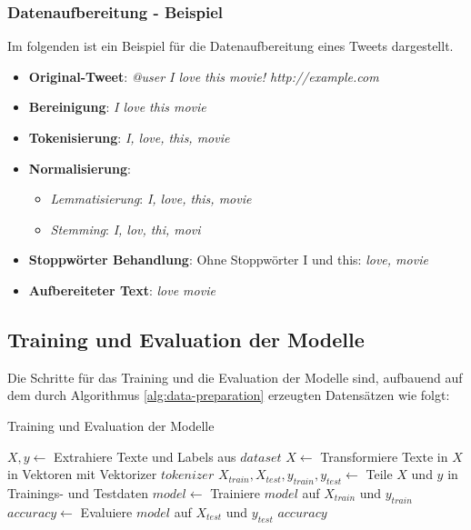 \subsubsection{Datenaufbereitung - Beispiel}

Im folgenden ist ein Beispiel für die Datenaufbereitung eines Tweets dargestellt.
\begin{itemize}
    \item \textbf{Original-Tweet}: \textit{\glqq @user I love this movie! http://example.com\grqq}
    \item \textbf{Bereinigung}: \textit{\glqq I love this movie\grqq}
    \item \textbf{Tokenisierung}: \textit{\glqq I\grqq, \glqq love\grqq, \glqq this\grqq, \glqq movie\grqq}
    \item \textbf{Normalisierung}:
    \begin{itemize}
        \item \textit{Lemmatisierung}: \textit{\glqq I\grqq, \glqq love\grqq, \glqq this\grqq, \glqq movie\grqq}
        \item \textit{Stemming}: \textit{\glqq I\grqq, \glqq lov\grqq, \glqq thi\grqq, \glqq movi\grqq}
    \end{itemize}
    \item \textbf{Stoppwörter Behandlung}: Ohne Stoppwörter \glqq{}I\grqq{} und \glqq{}this\grqq{}: \textit{\glqq love\grqq, \glqq movie\grqq}
    \item \textbf{Aufbereiteter Text}: \textit{\glqq love movie\grqq}
\end{itemize}

\subsection{Training und Evaluation der Modelle}

Die Schritte für das Training und die Evaluation der Modelle sind, aufbauend auf dem durch Algorithmus \ref{alg:data-preparation} erzeugten Datensätzen wie folgt:
\begin{algorithm}
    \caption{Training und Evaluation der Modelle}
    \begin{algorithmic}[1]
            \State $X, y \gets$ Extrahiere Texte und Labels aus $dataset$
            \State $X \gets$ Transformiere Texte in $X$ in Vektoren mit Vektorizer $tokenizer$
            \State $X_{train}, X_{test}, y_{train}, y_{test} \gets$ Teile $X$ und $y$ in Trainings- und Testdaten
            \State $model \gets$ Trainiere $model$ auf $X_{train}$ und $y_{train}$
            \State $accuracy \gets$ Evaluiere $model$ auf $X_{test}$ und $y_{test}$
            \State \Return $accuracy$
        \EndProcedure
    \end{algorithmic}
    \label{alg:model-training}
\end{algorithm}


